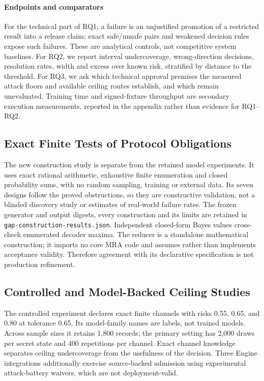 \documentclass[conference,compsoc]{IEEEtran}
\newcommand{\code}[1]{\texttt{\small #1}}
\begin{document}
\paragraph{Endpoints and comparators}
For the technical part of RQ1, a failure is an unjustified promotion of a
restricted result into a release claim; exact safe/unsafe pairs and weakened decision rules expose
such failures. These are analytical controls, not competitive system
baselines. For RQ2, we report interval undercoverage, wrong-direction
decisions, resolution rates, width and excess over known risk, stratified by
distance to the threshold. For RQ3, we ask which technical approval premises the measured attack floors
and available ceiling routes establish, and which remain unevaluated.
Training time and signed-fixture throughput are secondary execution
measurements, reported in the appendix rather than evidence for RQ1--RQ2.

\subsection{Exact Finite Tests of Protocol Obligations}
The new construction study is separate from the retained model experiments.
It uses exact rational arithmetic, exhaustive finite enumeration and closed
probability sums, with no random sampling, training or external data. Its
seven designs follow the proved obstructions, so they are constructive
validation, not a blinded discovery study or estimates of real-world failure
rates. The frozen generator and output digests, every construction and its
limits are retained in \code{gap-construction-results.json}.
Independent closed-form Bayes values cross-check enumerated decoder maxima.
The reducer is a standalone mathematical construction; it imports no core
MRA code and assumes rather than implements acceptance validity. Therefore
agreement with its declarative specification is not production refinement.

\subsection{Controlled and Model-Backed Ceiling Studies}
The controlled experiment declares exact finite channels with risks 0.55,
0.65, and 0.80 at tolerance 0.65. Its model-family names are labels, not trained
models. Across sample sizes it retains 1,800 records; the primary setting has
2,000 draws per secret state and 400 repetitions per channel. Exact channel
knowledge separates ceiling undercoverage from the usefulness of the decision.
Three Engine integrations additionally exercise source-backed admission using
experimental attack-battery waivers, which are not deployment-valid.
\end{document}
